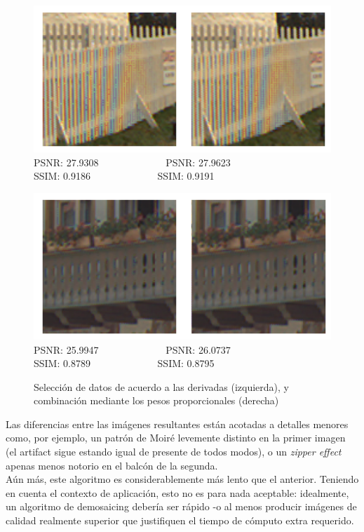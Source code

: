 \documentclass[a4paper]{article}
\begin{document}
\begin{figure}[h!]
	\begin{center}
	    \includegraphics[scale=0.47]{imagenes/Splines/RecortesSplines/prop/cerco.png}\\
	    PSNR: 27.9308 \ \ \ \ \ \ \ \ \ \ \ \ \ PSNR: 27.9623\\
	    SSIM: 0.9186 \ \ \ \ \ \ \ \ \ \ \ \ \ SSIM: 0.9191
	\end{center}
	\begin{center}
	    \includegraphics[scale=0.47]{imagenes/Splines/RecortesSplines/prop/balcon.png}\\
	    PSNR: 25.9947 \ \ \ \ \ \ \ \ \ \ \ \ \ PSNR: 26.0737\\
	    SSIM: 0.8789 \ \ \ \ \ \ \ \ \ \ \ \ \ SSIM: 0.8795
	\end{center}
	\caption{Selección de datos de acuerdo a las derivadas (izquierda), y combinación mediante los pesos proporcionales (derecha)}
	\label{splines4}
\end{figure}

Las diferencias entre las imágenes resultantes están acotadas a detalles menores como, por ejemplo, un patrón de Moiré levemente distinto en la primer imagen (el artifact sigue estando igual de presente de todos modos), o un \textit{zipper effect} apenas menos notorio en el balcón de la segunda.\\

Aún más, este algoritmo es considerablemente más lento que el anterior. Teniendo en cuenta el contexto de aplicación, esto no es para nada aceptable: idealmente, un algoritmo de demosaicing debería ser rápido -o al menos producir imágenes de calidad realmente superior que justifiquen el tiempo de cómputo extra requerido.\\
\end{document}
